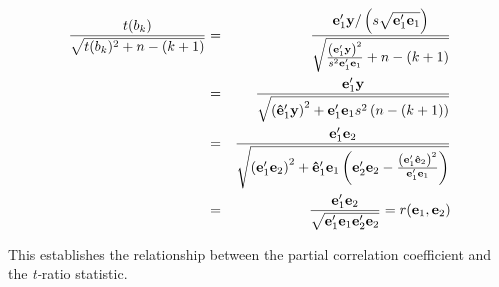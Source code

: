 \begin{center}
\begin{eqnarray*}
\frac{t(b_{k})}{\sqrt{t(b_{k})^2+n-(k+1)}} &=&\frac{\mathbf{e}%
_1^{\prime}\mathbf{y}/\left( s\sqrt{\mathbf{e}_1^{\prime}\mathbf{%
e}_1}\right) }{\sqrt{\frac{\left( \mathbf{e}_1^{\prime}%
\mathbf{y}\right) ^2}{s^2\mathbf{e}_1^{\prime}\mathbf{e}%
_1}+n-(k+1)}} \\
&=&\frac{\mathbf{e}_1^{\prime}\mathbf{y}}{\sqrt{\left( \mathbf{\hat{%
e}}_1^{\prime}\mathbf{y}\right) ^2+\mathbf{e}_1^{\prime}%
\mathbf{e}_1s^2\left( n-(k+1)\right) }} \\
&=&\frac{\mathbf{e}_1^{\prime}\mathbf{e}_2}{\sqrt{\left(
\mathbf{e}_1^{\prime}\mathbf{e}_2\right) ^2+\mathbf{\hat{e%
}}_1^{\prime}\mathbf{e}_1\left( \mathbf{e}_2^{\prime}%
\mathbf{e}_2-\frac{\left( \mathbf{e}_1^{\prime}\mathbf{\hat{%
e}}_2\right) ^2}{\mathbf{e}_1^{\prime}\mathbf{e}_1}%
\right) }} \\
&=&\frac{\mathbf{e}_1^{\prime}\mathbf{e}_2}{\sqrt{\mathbf{%
e}_1^{\prime}\mathbf{e}_1\mathbf{e}_2^{\prime}%
\mathbf{e}_2}}=r(\mathbf{e}_1,\mathbf{e}_2)
\end{eqnarray*}
\end{center}
This establishes the relationship between the partial correlation
coefficient and the \textit{t-}ratio statistic.
